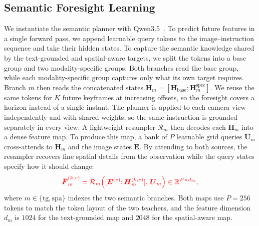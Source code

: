 \subsection{Semantic Foresight Learning}
\label{sec:method_planner}

We instantiate the semantic planner with Qwen3.5~\cite{qwen35}.
To predict future features in a single forward pass, we append learnable query
tokens to the image--instruction sequence and take their hidden states.
To capture the semantic knowledge shared by the text-grounded and spatial-aware
targets, we split the tokens into a base group and two modality-specific groups.
Both branches read the base group, while each modality-specific group captures
only what its own target requires.
Branch $m$ then reads the concatenated states
$\mathbf{H}_m=[\mathbf{H}_{\mathrm{base}};\mathbf{H}_m^{\mathrm{spec}}]$.
We reuse the same tokens for $K$ future keyframes at increasing offsets, so the
foresight covers a horizon instead of a single instant.
The planner is applied to each camera view independently and with shared
weights, so the same instruction is grounded separately in every view.
A lightweight resampler $\mathcal{R}_m$ then decodes each $\mathbf{H}_m$ into a
dense feature map.
To produce this map, a bank of $P$ learnable grid queries $\mathbf{U}_m$
cross-attends to $\mathbf{H}_m$ and the image states $\mathbf{E}$.
By attending to both sources, the resampler recovers fine spatial details from the observation while the query states specify how it should change:
\begin{equation}
    \color{red}
    \hat{\boldsymbol{F}}_m^{(k,v)}
    =
    \mathcal{R}_m\!\left([\boldsymbol{E}^{(v)};\boldsymbol{H}_m^{(k,v)}],\,\boldsymbol{U}_m\right)
    \in\mathbb{R}^{P\times d_m},
    \label{eq:resampler}
\end{equation}
where $m\in\{\mathrm{tg},\mathrm{spa}\}$ indexes the two semantic branches.
Both maps use $P{=}256$ tokens to match the token layout of the two teachers, and the feature dimension $d_m$ is $1024$ for the
text-grounded map and $2048$ for the spatial-aware map.

